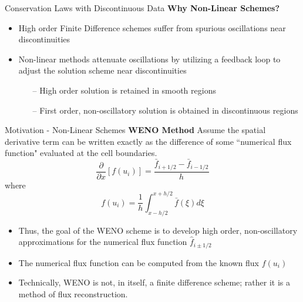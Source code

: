 \documentclass[9pt]{beamer}
\begin{document}
\begin{frame}{Conservation Laws with Discontinuous Data}
  \textbf{Why Non-Linear Schemes?}
  \begin{itemize}
  \item High order Finite Difference schemes suffer from spurious oscillations near discontinuities
  \item Non-linear methods attenuate oscillations by utilizing a feedback loop to adjust the solution scheme near discontinuities
  \begin{itemize}
  \item[--] High order solution is retained in smooth regions 
  \item[--] First order, non-oscillatory solution is obtained in discontinuous regions
  \end{itemize}
  \end{itemize}
\end{frame}

\begin{frame}{Motivation - Non-Linear Schemes}
  \textbf{WENO Method}  
  \newline Assume the spatial derivative term can be written exactly as the difference of some ``numerical flux function" evaluated at the cell boundaries.
  \begin{equation}
    \frac{\partial}{\partial x}[f(u_i)] = \frac{\bar{f}_{i+1 /2} - \bar{f}_{i-1/2}}{h}
  \end{equation}
  where
  \begin{equation}
    f(u_i)=\frac{1}{h}\int_{x-h/2}^{x+h/2} \bar{f}(\xi)d\xi
  \end{equation}
  \begin{itemize}
  \item Thus, the goal of the WENO scheme is to develop high order, non-oscillatory approximations for the numerical flux function $\hat{f}_{i\pm1/2}$
  \item The numerical flux function can be computed from the known flux $f(u_i)$
  \item Technically, WENO is not, in itself, a finite difference scheme; rather it is a method of flux reconstruction. \cite{Jiang96,Henrick05}
  \end{itemize}
  \end{frame}
\end{document}
